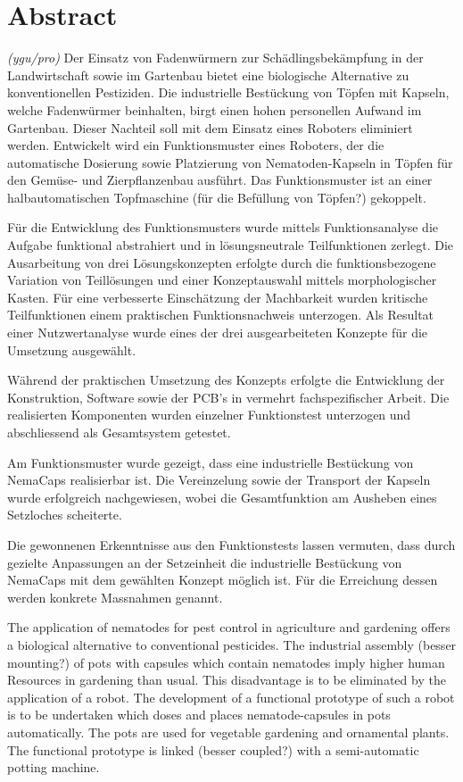 \newpage
\section{Abstract}
\textit{(ygu/pro)} Der Einsatz von Fadenwürmern zur Schädlingsbekämpfung in der Landwirtschaft sowie im Gartenbau bietet eine biologische Alternative zu konventionellen Pestiziden. Die industrielle Bestückung von Töpfen mit Kapseln, welche Fadenwürmer beinhalten, birgt einen hohen personellen Aufwand im Gartenbau. Dieser Nachteil soll mit dem Einsatz eines Roboters eliminiert werden. Entwickelt wird ein Funktionsmuster eines Roboters, der die automatische Dosierung sowie Platzierung von Nematoden-Kapseln in Töpfen für den Gemüse- und Zierpflanzenbau ausführt. Das Funktionsmuster ist an einer halbautomatischen Topfmaschine (für die Befüllung von Töpfen?) gekoppelt.
\newline

Für die Entwicklung des Funktionsmusters wurde mittels Funktionsanalyse die Aufgabe funktional abstrahiert und in lösungsneutrale Teilfunktionen zerlegt. Die Ausarbeitung von drei Lösungskonzepten erfolgte durch die funktionsbezogene Variation von Teillösungen und einer Konzeptauswahl mittels morphologischer Kasten. Für eine verbesserte Einschätzung der Machbarkeit wurden kritische Teilfunktionen einem praktischen Funktionsnachweis unterzogen. Als Resultat einer Nutzwertanalyse wurde eines der drei ausgearbeiteten Konzepte für die Umsetzung ausgewählt. 
\newline

Während der praktischen Umsetzung des Konzepts erfolgte die Entwicklung der Konstruktion, Software sowie der PCB’s in vermehrt fachspezifischer Arbeit. Die realisierten Komponenten wurden einzelner Funktionstest unterzogen und abschliessend als Gesamtsystem getestet.
\newline

Am Funktionsmuster wurde gezeigt, dass eine industrielle Bestückung von NemaCaps realisierbar ist. Die Vereinzelung sowie der Transport der Kapseln wurde erfolgreich nachgewiesen, wobei die Gesamtfunktion am Ausheben eines Setzloches scheiterte.
\newline

Die gewonnenen Erkenntnisse aus den Funktionstests lassen vermuten, dass durch gezielte Anpassungen an der Setzeinheit die industrielle Bestückung von NemaCaps mit dem gewählten Konzept möglich ist. Für die Erreichung dessen werden konkrete Massnahmen genannt.

\newpage
The application of nematodes for pest control in agriculture and gardening offers a biological alternative to conventional pesticides. The industrial assembly (besser mounting?) of pots with capsules which contain nematodes imply higher human Resources in gardening than usual. This disadvantage is to be eliminated by the application of a robot. The development of a functional prototype of such a robot is to be undertaken which doses and places nematode-capsules in pots automatically. The pots are used for vegetable gardening and ornamental plants. The functional prototype is linked (besser coupled?) with a semi-automatic potting machine.
\newline

